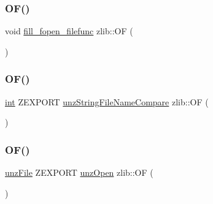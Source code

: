 \mbox{\label{namespacezlib_a51f7082e5a7503071ac9f75900f7b42c}} 
\subsubsection{\texorpdfstring{O\+F()}{OF()}\hspace{0.1cm}{\footnotesize\ttfamily [1/13]}}
{\footnotesize\ttfamily void \hyperlink{ioapi_8c_ab44f1d585b26ce7f9447a91ada432727}{fill\+\_\+fopen\+\_\+filefunc} zlib\+::\+OF (\begin{DoxyParamCaption}\item[{(\hyperlink{namespacezlib_a4ada5a935fba7f21209bc451eb7ffbc7}{zlib\+\_\+filefunc\+\_\+def} $\ast$pzlib\+\_\+filefunc\+\_\+def)}]{ }\end{DoxyParamCaption})}

\mbox{\label{namespacezlib_ab929b496106137b4db7ce431e43400d5}} 
\subsubsection{\texorpdfstring{O\+F()}{OF()}\hspace{0.1cm}{\footnotesize\ttfamily [2/13]}}
{\footnotesize\ttfamily \hyperlink{namespacezlib_a0c9da18d93722fcf02a354ae2b6ec1ba}{int} Z\+E\+X\+P\+O\+RT \hyperlink{unzip_8c_aaf81e433f9a497102e477a59d783ae18}{unz\+String\+File\+Name\+Compare} zlib\+::\+OF (\begin{DoxyParamCaption}\item[{(const char $\ast$file\+Name1, const char $\ast$file\+Name2, \hyperlink{namespacezlib_a0c9da18d93722fcf02a354ae2b6ec1ba}{int} i\+Case\+Sensitivity)}]{ }\end{DoxyParamCaption})}

\mbox{\label{namespacezlib_a4ed1c132c434df9aa80c3d20ca68f01f}} 
\subsubsection{\texorpdfstring{O\+F()}{OF()}\hspace{0.1cm}{\footnotesize\ttfamily [3/13]}}
{\footnotesize\ttfamily \hyperlink{namespacezlib_a48c1eb530e72d2132ea9cb6648f4047e}{unz\+File} Z\+E\+X\+P\+O\+RT \hyperlink{unzip_8c_a614a4ee72e9055e5657d28487c2a7936}{unz\+Open} zlib\+::\+OF (\begin{DoxyParamCaption}\item[{(const char $\ast$path)}]{ }\end{DoxyParamCaption})}

